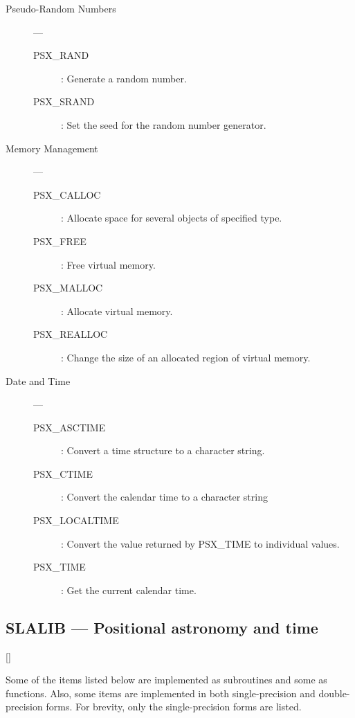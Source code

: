 \begin{description}

\item [Pseudo-Random Numbers] ---

\begin{description}
\item [PSX\_RAND] : Generate a random number.
\item [PSX\_SRAND] : Set the seed for the random number generator.
\end{description}

\item [Memory Management] ---

\begin{description}
\item [PSX\_CALLOC] : Allocate space for several objects of specified type.
\item [PSX\_FREE] : Free virtual memory.
\item [PSX\_MALLOC] : Allocate virtual memory.
\item [PSX\_REALLOC] : Change the size of an allocated region of virtual memory.
\end{description}

\item [Date and Time] ---

\begin{description}
\item [PSX\_ASCTIME] : Convert a time structure to a character string.
\item [PSX\_CTIME] : Convert the calendar time to a character string
\item [PSX\_LOCALTIME] : Convert the value returned by PSX\_TIME to individual values.
\item [PSX\_TIME] : Get the current calendar time.
\end{description}
\end{description}

\newpage

\subsection{SLALIB --- Positional astronomy and time} 

\vspace{-9mm}

\hfill []

\vspace{2mm}

Some of the items listed below are implemented as subroutines and some as
functions.
Also, some items are implemented in both single-precision and double-precision
forms.
For brevity, only the single-precision forms are listed.

